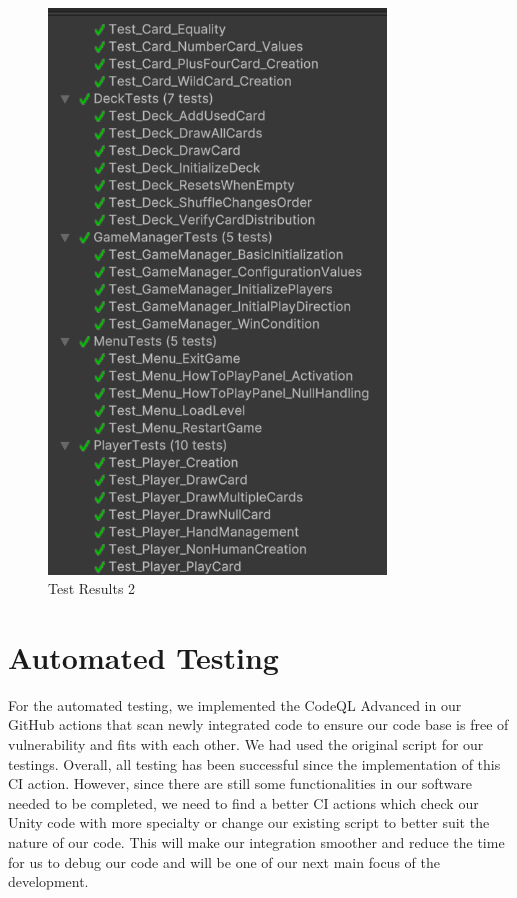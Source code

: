 \documentclass[12pt, titlepage]{article}
\begin{document}
\begin{figure}[H]
    \centering
    \includegraphics[width=0.8\textwidth]{passedTests2.png}
    \caption{Test Results 2}
    \label{fig:test_results_2}
\end{figure}

\section{Automated Testing}
For the automated testing, we implemented the CodeQL Advanced in our GitHub actions that scan newly integrated code to ensure our code base is free of vulnerability and fits with each other. We had used the original script for our testings. Overall, all testing has been successful since the implementation of this CI action. However, since there are still some functionalities in our software needed to be completed, we need to find a better CI actions which check our Unity code with more specialty or change our existing script to better suit the nature of our code. This will make our integration smoother and reduce the time for us to debug our code and will be one of our next main focus of the development.
\end{document}
